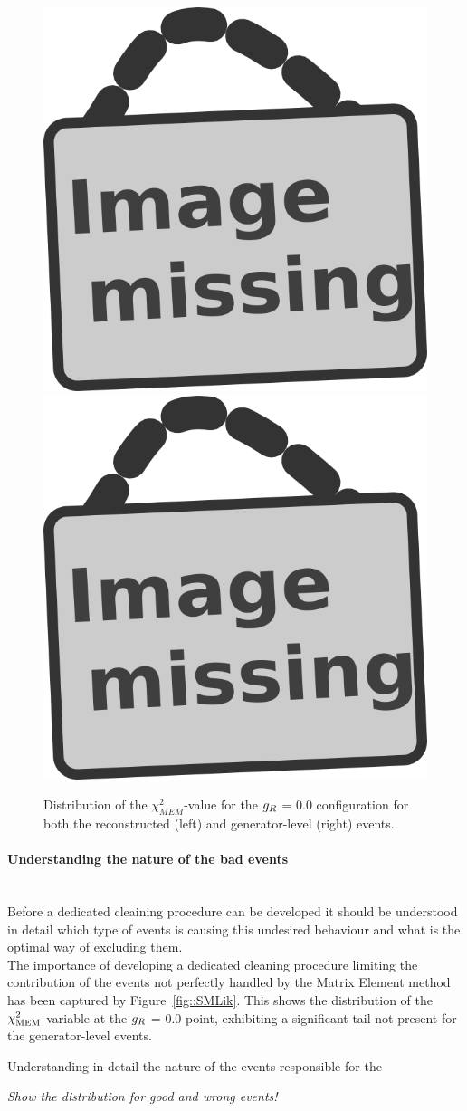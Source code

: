 \begin{figure}[h!t]
 \centering
 \includegraphics[width = 0.35 \textwidth]{image.png} \hspace{0.3cm}
 \includegraphics[width = 0.35 \textwidth]{image.png}
 \caption{Distribution of the $\chi^{2}_{MEM}$-value for the $g_{R}$ = $0.0$ configuration for both the reconstructed (left) and generator-level (right) events.} \label{Fig::SMLik}
\end{figure}

\paragraph{Understanding the nature of the bad events} \hfill \\

Before a dedicated cleaining procedure can be developed it should be understood in detail which type of events is causing this undesired behaviour and what is the optimal way of excluding them.
\\

The importance of developing a dedicated cleaning procedure limiting the contribution of the events not perfectly handled by the Matrix Element method has been captured by Figure~\ref{fig::SMLik}.
This shows the distribution of the $\chi^{2}_{\textrm{MEM}}$-variable at the $g_{R}$ = $0.0$ point, exhibiting a significant tail not present for the generator-level events. 

Understanding in detail the nature of the events responsible for the 

\textit{Show the distribution for good and wrong events!}

